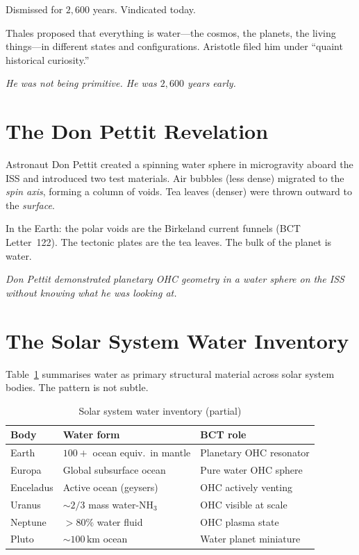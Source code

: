 \documentclass[aps,prl,twocolumn,superscriptaddress,floatfix]{revtex4-2}
\begin{document}
\noindent Dismissed for $2{,}600$ years. Vindicated today.

Thales proposed that everything is water---the cosmos, the planets,
the living things---in different states and configurations. Aristotle
filed him under ``quaint historical curiosity.''

\textit{He was not being primitive. He was $2{,}600$ years early.}

\section{The Don Pettit Revelation}

Astronaut Don Pettit created a spinning water sphere in microgravity
aboard the ISS and introduced two test materials. Air bubbles (less
dense) migrated to the \emph{spin axis}, forming a column of voids.
Tea leaves (denser) were thrown outward to the \emph{surface}.

In the Earth: the polar voids are the Birkeland current funnels
(BCT Letter~122). The tectonic plates are the tea leaves. The bulk
of the planet is water.

\textit{Don Pettit demonstrated planetary OHC geometry in a water
sphere on the ISS without knowing what he was looking at.}

\section{The Solar System Water Inventory}

Table~\ref{tab:water} summarises water as primary structural material
across solar system bodies. The pattern is not subtle.

\begin{table}[h]
\caption{Solar system water inventory (partial)}
\label{tab:water}
\begin{ruledtabular}
\begin{tabular}{lll}
Body & Water form & BCT role \\
\hline
Earth & $100{+}$ ocean equiv.\ in mantle & Planetary OHC resonator \\
Europa & Global subsurface ocean & Pure water OHC sphere \\
Enceladus & Active ocean (geysers) & OHC actively venting \\
Uranus & ${\sim}2/3$ mass water-NH$_3$ & OHC visible at scale \\
Neptune & $>80\%$ water fluid & OHC plasma state \\
Pluto & ${\sim}100\,\mathrm{km}$ ocean & Water planet miniature \\
\end{tabular}
\end{ruledtabular}
\end{table}
\end{document}
